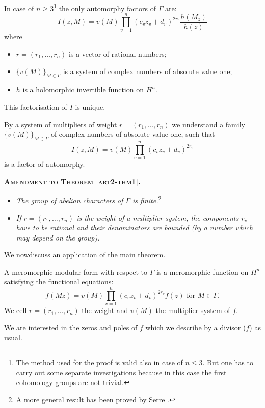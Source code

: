 \begin{thm}\label{art2-thm1}%
In case of $n \geqslant 3$\footnote{The method used for the proof is valid also in case of $n \leq 3$. But one has to carry out some separate investigations because in this case the first cohomology groups are not trivial.} the only automorphy factors of $\Gamma$ are:
$$
I (z, M) = v (M) \prod^n_{v=1} (c_v z_v + d_v)^{2r_v} \frac{h(M_z)}{h(z)}
$$
where 
\begin{itemize}
\item[a)] $r = (r_1 , \ldots , r_n)$ is a vector of rational numbers;

\item[b)] $\{v (M)\}_{M \in \Gamma}$ is a system of complex numbers of absolute value one;

\item[c)] $h$ is a holomorphic invertible function on $H^n$.
\end{itemize}
This factorisation of $I$ is unique.
\end{thm}

By a system of multipliers of weight $r = (r_1, \ldots, r_n)$ we understand a family $\{v (M)\}_{M \in \Gamma}$ of complex numbers of absolute value one, such that
$$
I(z, M) = v(M) \prod^n_{v=1} (c_v z_v + d_v)^{2r_v}
$$
is a factor of automorphy.

\medskip
\noindent
\textsc{\textbf{Amendment to Theorem \ref{art2-thm1}.}}

\begin{itemize}
\item[1)] \textit{The group of abelian characters of $\Gamma$ is finite.}\footnote{A more general result has been proved by Serre \cite{art2-key4}.}

\item[2)] \textit{If $r = (r_1, \ldots, r_n)$ is the weight of a multiplier system, the components $r_v$ have to be rational and their denominators are bounded (by a number which may depend on the group)}.
\end{itemize}

We now\pageoriginale discuss an application of the main theorem.

A meromorphic modular form with respect to $\Gamma$ is a meromorphic function on $H^n$ satisfying the functional equations:
$$
 f(Mz) = v (M) \prod^n_{v=1} (c_v z_v + d_v)^{2r_v} f (z) \text{ for } M \in \Gamma.
$$
We cell $r = (r_1, \ldots, r_n)$ the weight and $v(M)$ the multiplier system of $f$.

We are interested in the zeros and poles of $f$ which we describe by a divisor ($f$) as usual.

